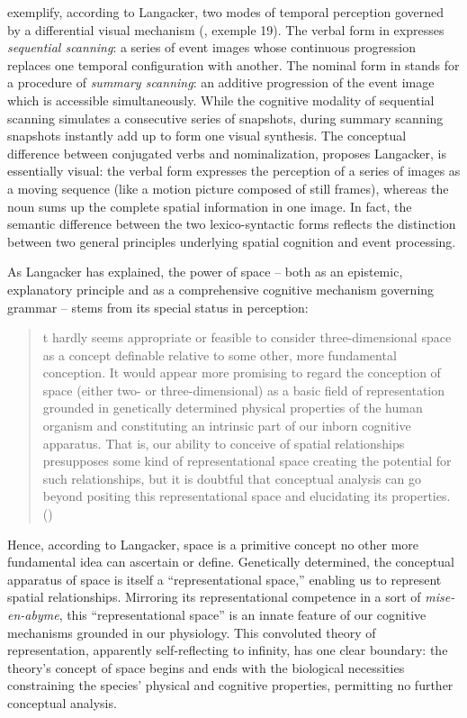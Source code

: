 \documentclass[output=paper]{langsci/langscibook}
\begin{document}
exemplify, according to Langacker, two modes of temporal perception governed by a differential visual mechanism (\citeyear[146]{langacker_foundations_1987}, exemple 19). The verbal form in  expresses \textit{sequential scanning}: a series of event images whose continuous progression replaces one temporal configuration with another. The nominal form in  stands for a procedure of \textit{summary scanning}: an additive progression of the event image which is accessible simultaneously. While the cognitive modality of sequential scanning simulates a consecutive series of snapshots, during summary scanning snapshots instantly add up to form one visual synthesis. The conceptual difference between conjugated verbs and nominalization, proposes Langacker, is essentially visual: the verbal form expresses the perception of a series of images as a moving sequence (like a motion picture composed of still frames), whereas the noun sums up the complete spatial information in one image. In fact, the semantic difference between the two lexico\nobreakdash-syntactic forms reflects the distinction between two general principles underlying spatial cognition and event processing.

As Langacker has explained, the power of space -- both as an epistemic, explanatory principle and as a comprehensive cognitive mechanism governing grammar -- stems from its special status in perception:

\begin{quote}\relax
[I]t hardly seems appropriate or feasible to consider three-dimensional space as a concept definable relative to some other, more fundamental conception. It would appear more promising to regard the conception of space (either two- or three-dimensional) as a basic field of representation grounded in genetically determined physical properties of the human organism and constituting an intrinsic part of our inborn cognitive apparatus. That is, our ability to conceive of spatial relationships presupposes some kind of representational space creating the potential for such relationships, but it is doubtful that conceptual analysis can go beyond positing this representational space and elucidating its properties. (\citealt [148] {langacker_foundations_1987})
\end{quote}

Hence, according to Langacker, space is a primitive concept no other more fundamental idea can ascertain or define. Genetically determined, the conceptual apparatus of space is itself a “representational space,” enabling us to represent spatial relationships. Mirroring its representational competence in a sort of \textit{mise\nobreakdash-en\nobreakdash-abyme}, this “representational space” is an innate feature of our cognitive mechanisms grounded in our physiology. This convoluted theory of representation, apparently self-reflecting to infinity, has one clear boundary: the theory’s concept of space begins and ends with the biological necessities constraining the species’ physical and cognitive properties, permitting no further conceptual analysis. 
\end{document}
